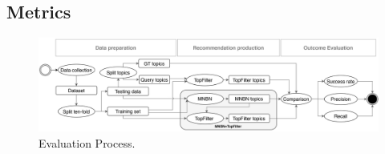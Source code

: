 

\subsection{Metrics}\label{sec:metrics}

\begin{figure}[t!]
	\centering
	\includegraphics[width=0.96\linewidth,keepaspectratio]{figs/evaluationCF.pdf}
	\caption{Evaluation Process.}
	\label{fig:EvaluationProcess}
	\vspace{-.3cm}
\end{figure}


